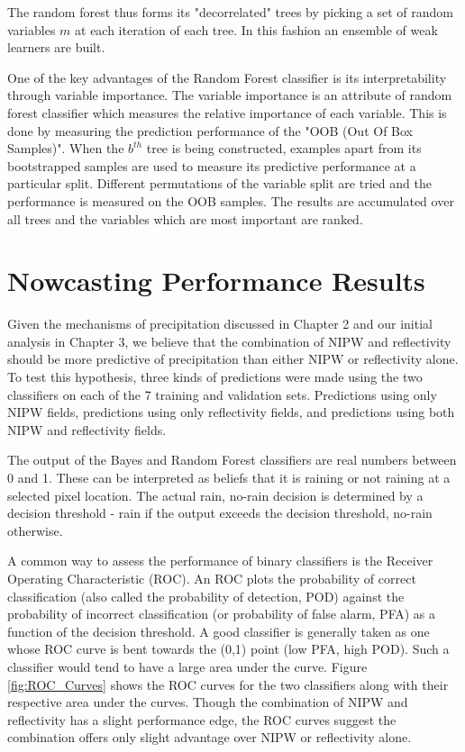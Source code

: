 \documentclass[proposal]{umassthesis}
\begin{document}
{The random forest thus forms its "decorrelated" trees by picking a set of random variables $m$ at each iteration of each tree. In this fashion an ensemble of weak learners are built.

 One of the key advantages of the Random Forest classifier is its interpretability through variable importance. The variable importance is an attribute of random forest classifier which measures the relative importance of each variable. This is done by measuring the prediction performance of the "OOB (Out Of Box Samples)". When the $b^{th}$ tree is being constructed, examples apart from its bootstrapped samples are used to measure its predictive performance at a particular split. Different permutations of the variable split are tried and the performance is measured on the OOB samples. The results are accumulated over all trees and the variables which are most important are ranked.
 
\section{Nowcasting Performance Results}

Given the mechanisms of precipitation discussed in Chapter 2 and our initial analysis in Chapter 3, we believe that the combination of NIPW and reflectivity should be more predictive of precipitation than either NIPW or reflectivity alone. To test this hypothesis, three kinds of predictions were made using the two classifiers on each of the 7 training and validation sets. Predictions using only NIPW fields, predictions using only reflectivity fields, and predictions using both NIPW and reflectivity fields. 

The output of the Bayes and Random Forest classifiers are real numbers between 0 and 1. These can be interpreted as beliefs that it is raining or not raining at a selected pixel location. The actual rain, no-rain decision is determined by a decision threshold - rain if the output exceeds the decision threshold, no-rain otherwise.

A common way to assess the performance of binary classifiers is the Receiver Operating Characteristic (ROC). An ROC plots the probability of correct classification (also called the probability of detection, POD) against the probability of incorrect classification (or probability of false alarm, PFA) as a function of the decision threshold. A good classifier is generally taken as one whose ROC curve is bent towards the (0,1) point (low PFA, high POD). Such a classifier would tend to have a large area under the curve. Figure \ref{fig:ROC_Curves} shows the ROC curves for the two classifiers along with their respective area under the curves. Though the combination of NIPW and reflectivity has a slight performance edge, the ROC curves suggest the combination offers only slight advantage over NIPW or reflectivity alone.

}
\end{document}

